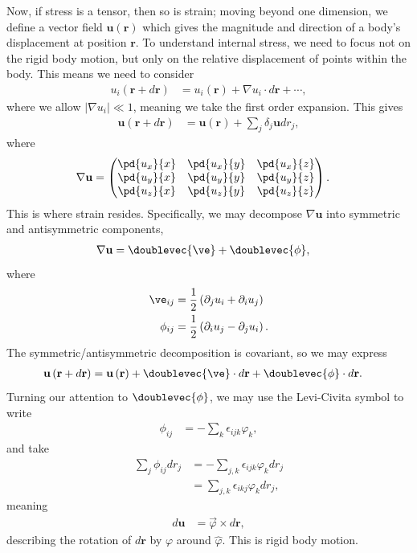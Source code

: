 \documentclass[10pt]{mypackage}
\begin{document}
  Now, if stress is a tensor, then so is strain; moving beyond one dimension, we define a vector field $\mathbf{u}\left( \mathbf{r} \right)$ which gives the magnitude and direction of a body's displacement at position $\mathbf{r}$. To understand internal stress, we need to focus not on the rigid body motion, but only on the relative displacement of points within the body. This means we need to consider
  \begin{align*}
    u_i\left( \mathbf{r} + d\mathbf{r} \right) &= u_i\left( \mathbf{r} \right) + \nabla u_i \cdot d\mathbf{r} + \cdots,
  \end{align*}
  where we allow $\left\vert \nabla u_i \right\vert \ll 1$, meaning we take the first order expansion. This gives
  \begin{align*}
    \mathbf{u}\left( \mathbf{r} + d\mathbf{r} \right) &= \mathbf{u}\left( \mathbf{r} \right) + \sum_{j} \delta_j \mathbf{u}dr_j,
  \end{align*}
  where
  \begin{align*}
    \nabla \mathbf{u} &= \begin{pmatrix} \pd{u_x}{x} & \pd{u_x}{y} & \pd{u_x}{z} \\ \pd{u_y}{x} & \pd{u_y}{y} & \pd{u_y}{z} \\ \pd{u_z}{x} & \pd{u_z}{y} & \pd{u_z}{z}\end{pmatrix}.
  \end{align*}
  This is where strain resides. Specifically, we may decompose $\nabla \mathbf{u}$ into symmetric and antisymmetric components,
  \begin{align*}
    \nabla \mathbf{u} &= \doublevec{\ve} + \doublevec{\phi},
  \end{align*}
  where
  \begin{align*}
    \ve_{ij} &= \frac{1}{2}\left( \partial_ju_i + \partial_iu_j \right)\\
    \phi_{ij} &= \frac{1}{2}\left( \partial_iu_j - \partial_ju_i \right).
  \end{align*}
  The symmetric/antisymmetric decomposition is covariant, so we may express
  \begin{align*}
    \mathbf{u}\left( \mathbf{r} + d\mathbf{r} \right) &= \mathbf{u}\left( \mathbf{r} \right) + \doublevec{\ve}\cdot d\mathbf{r} + \doublevec{\phi}\cdot d\mathbf{r}.
  \end{align*}
  Turning our attention to $\doublevec{\phi}$, we may use the Levi-Civita symbol to write
  \begin{align*}
    \phi_{ij} &= -\sum_{k} \epsilon_{ijk}\varphi_k,
  \end{align*}
  and take
  \begin{align*}
    \sum_{j}\phi_{ij}dr_j &= -\sum_{j,k} \epsilon_{ijk}\varphi_kdr_j\\
                          &= \sum_{j,k}\epsilon_{ikj}\varphi_kdr_j,
  \end{align*}
  meaning
  \begin{align*}
    d\mathbf{u} &= \vec{\varphi}\times d\mathbf{r},
  \end{align*}
  describing the rotation of $d\mathbf{r}$ by $\varphi$ around $\hat{\varphi}$. This is rigid body motion.\newline
\end{document}
